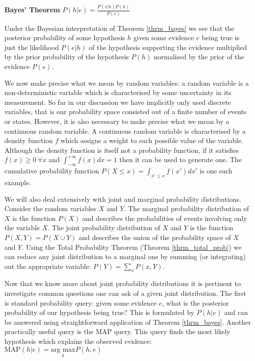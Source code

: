 \documentclass[../masters.tex]{subfiles}
\begin{document}
\begin{thrm}
\textbf{Bayes' Theorem} $P(h|e) = \frac{P(e|h)P(h)}{P(e)}$
\label{thrm_bayes}
\end{thrm}
Under the Bayesian interpretation of Theorem \ref{thrm_bayes} we see that the posterior probability of some hypothesis $h$ given some evidence $e$ being true is just the likelihood $P(e|h)$ of the hypothesis supporting the evidence multiplied by the prior probability of the hypothesis $P(h)$ normalised by the prior of the evidence $P(e)$. 

We now make precise what we mean by random variables: a random variable is a non-deterministic variable which is characterised by some uncertainty in its measurement. So far in our discussion we have implicitly only used discrete variables, that is our probability space consisted out of a finite number of events or states. However, it is also necessary to make precise what we mean by a continuous random variable. A continuous random variable is characterised by a density function $f$ which assigns a weight to each possible value of the variable. Although the density function is itself not a probability function, if it satisfies $f(x) \geq 0~\forall x$ and $\int_{-\infty}^{+\infty} f(x)dx = 1$ then it can be used to generate one. The cumulative probability function $P(X \leq x)=\int_{x\prime \leq x}f(x\prime)dx\prime$ is one such example. 

We will also deal extensively with joint and marginal probability distributions. Consider the random variables $X$ and $Y$. The marginal probability distribution of $X$ is the function $P(X)$ and describes the probabilities of events involving only the variable $X$. The joint probability distribution of $X$ and $Y$ is the function $P(X,Y) = P(X \cup Y)$ and describes the union of the probability space of $X$ and $Y$. Using the Total Probability Theorem (Theorem \ref{thrm_total_prob}) we can reduce any joint distribution to a marginal one by summing (or integrating) out the appropriate variable: $P(Y) = \sum_x P(x, Y)$. 

Now that we know more about joint probability distributions it is pertinent to investigate common questions one can ask of a given joint distribution. The first is standard probability query: given some evidence $e$, what is the posterior probability of our hypothesis being true? This is formulated by $P(h|e)$ and can be answered using straightforward application of Theorem \ref{thrm_bayes}. Another practically useful query is the MAP query. This query finds the most likely hypothesis which explains the observed evidence: $\text{MAP}(h|e)=\underset{h}{\text{arg max}} P(h,e) $
\end{document}

